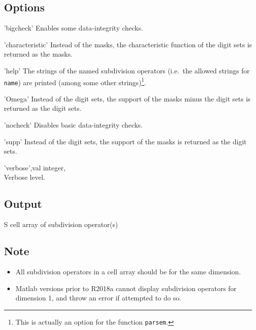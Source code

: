 \subsection*{Options}
\begin{param}
    \item['bigcheck'] Enables some data-integrity checks.

    \item['characteristic']  Instead of the masks, the characteristic function of the digit sets is returned as the masks.
    
    \item['help'] The strings of the named subdivision operators (i.e.\ the allowed strings for \texttt{name})  are printed (among some other strings)\footnote{This is actually an option for the function \texttt{parsem}.}.    

    \item['Omega'] Instead of the digit sets, the support of the masks minus the digit sets is returned as the digit sets.
    
    \item['nocheck'] Disables basic data-integrity checks.

    \item['supp'] Instead of the digit sets, the support of the masks is returned as the digit sets.        

    \item['verbose',val] integer, \\Verbose level.

\end{param}

\subsection*{Output}
\begin{param}
\item[S] cell array of subdivision operator(s)
\end{param}   

\subsection*{Note}
\begin{itemize}
\item All subdivision operators in a cell array should be for the same dimension.
\item Matlab versions prior to R2018a cannot display subdivision operators for dimension 1, and throw an error if attempted to do so. 
\end{itemize}

